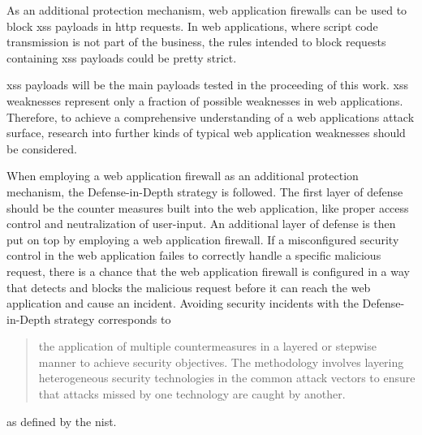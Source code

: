 As an additional protection mechanism, web application firewalls can be used to block \acrshort{xss} payloads in \acrshort{http} requests. In web applications, where script code transmission is not part of the business, the rules intended to block requests containing \acrshort{xss} payloads could be pretty strict.

\acrshort{xss} payloads will be the main payloads tested in the proceeding of this work. 
\acrshort{xss} weaknesses represent only a fraction of possible weaknesses in web applications. Therefore, to achieve a comprehensive understanding of a web applications attack surface, research into further kinds of typical web application weaknesses should be considered.

When employing a web application firewall as an additional protection mechanism, the Defense-in-Depth strategy is followed.
The first layer of defense should be the counter measures built into the web application, like proper access control and neutralization of user-input. 
An additional layer of defense is then put on top by employing a web application firewall.
If a misconfigured security control in the web application failes to correctly handle a specific malicious request, there is a chance that the web application firewall is configured in a way that detects and blocks the malicious request before it can reach the web application and cause an incident.
Avoiding security incidents with the Defense-in-Depth strategy corresponds to
\begin{quote}
	the application of multiple countermeasures in a layered or stepwise manner to achieve security objectives. The methodology involves layering heterogeneous security technologies in the common attack vectors to ensure that attacks missed by one technology are caught by another.
\end{quote}
as defined by the \acrfull{nist}. \cite{nist/did}

